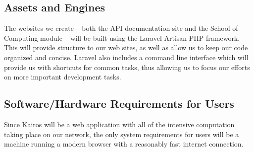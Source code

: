 \documentclass{extarticle}
\begin{document}
\subsection{Assets and Engines}
The websites we create -- both the API documentation site and the School of Computing module -- will be built using
the Laravel Artisan PHP framework.  This will provide structure to our web sites, as well as allow us to keep our
code organized and concise.  Laravel also includes a command line interface which will provide us with shortcuts
for common tasks, thus allowing us to focus our efforts on more important development tasks.

\subsection{Software/Hardware Requirements for Users}
Since Kairos will be a web application with all of the intensive computation taking place on our network, the only
system requirements for users will be a machine running a modern browser with a reasonably fast internet connection.
\end{document}
